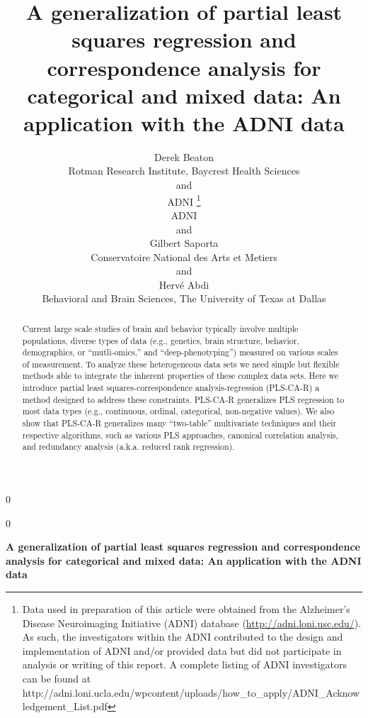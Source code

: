 \documentclass[12pt]{article}
\newcommand{\blind}{0}
\begin{document}
\def\spacingset#1{\renewcommand{\baselinestretch}%
{#1}\small\normalsize} \spacingset{1}



\blind
{
  \title{\bf A generalization of partial least squares regression and correspondence
analysis for categorical and mixed data: An application with the ADNI
data}

  \author{
        Derek Beaton \\
    Rotman Research Institute, Baycrest Health Sciences\\
     and \\     ADNI \thanks{Data used in preparation of this article were obtained from the
Alzheimer's Disease Neuroimaging Initiative (ADNI) database
(\url{http://adni.loni.usc.edu/}). As such, the investigators within the
ADNI contributed to the design and implementation of ADNI and/or
provided data but did not participate in analysis or writing of this
report. A complete listing of ADNI investigators can be found at
http://adni.loni.ucla.edu/wpcontent/uploads/how\_to\_apply/ADNI\_Acknowledgement\_List.pdf} \\
    ADNI\\
     and \\     Gilbert Saporta \\
    Conservatoire National des Arts et Metiers\\
     and \\     Hervé Abdi \\
    Behavioral and Brain Sciences, The University of Texas at Dallas\\
      }
  \maketitle
} \fi

\blind
{
  \bigskip
  \bigskip
  \bigskip
  \begin{center}
    {\LARGE\bf A generalization of partial least squares regression and correspondence
analysis for categorical and mixed data: An application with the ADNI
data}
  \end{center}
  \medskip
} \fi

\bigskip
\begin{abstract}
Current large scale studies of brain and behavior typically involve
multiple populations, diverse types of data (e.g., genetics, brain
structure, behavior, demographics, or ``mutli-omics,'' and
``deep-phenotyping'') measured on various scales of measurement. To
analyze these heterogeneous data sets we need simple but flexible
methods able to integrate the inherent properties of these complex data
sets. Here we introduce partial least squares-correspondence
analysis-regression (PLS-CA-R) a method designed to address these
constraints. PLS-CA-R generalizes PLS regression to most data types
(e.g., continuous, ordinal, categorical, non-negative values). We also
show that PLS-CA-R generalizes many ``two-table'' multivariate
techniques and their respective algorithms, such as various PLS
approaches, canonical correlation analysis, and redundancy analysis
(a.k.a. reduced rank regression).
\end{abstract}
\end{document}
